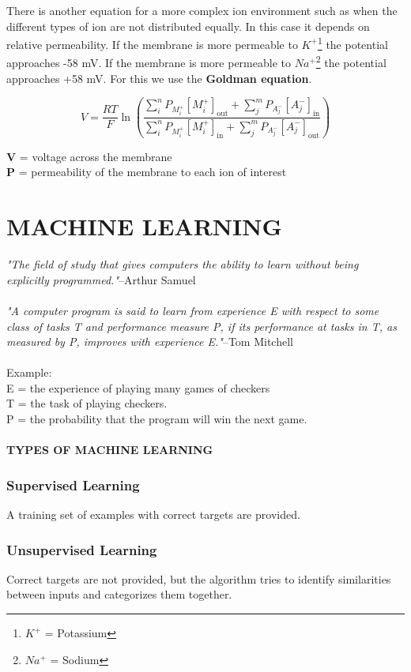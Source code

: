 \documentclass[english]{def}
\begin{document}
There is another equation for a more complex ion environment such as when the different types of ion are not distributed equally. In this case it depends on relative permeability. If the membrane is more permeable to $K^+$\footnote{$K^+$ = Potassium} the potential approaches -58 mV. If the membrane is more permeable to $Na^+$\footnote{$Na^+$ = Sodium} the potential approaches +58 mV. For this we use the \textbf{Goldman equation}.

\[ V={\frac {RT}{F}}\ln {\left({\frac {\sum _{i}^{n}P_{M_{i}^{+}}[M_{i}^{+}]_{\mathrm {out} }+\sum _{j}^{m}P_{A_{j}^{-}}[A_{j}^{-}]_{\mathrm {in} }}{\sum _{i}^{n}P_{M_{i}^{+}}[M_{i}^{+}]_{\mathrm {in} }+\sum _{j}^{m}P_{A_{j}^{-}}[A_{j}^{-}]_{\mathrm {out} }}}\right)}\]

\noindent\textbf{V} = voltage across the membrane\\
\textbf{P} = permeability of the membrane to each ion of interest\\

\section{MACHINE LEARNING}

\emph{ "The field of study that gives computers the ability to learn without being explicitly programmed."}--Arthur Samuel
\\\\
\emph{"A computer program is said to learn from experience E with respect to some class of tasks T and performance measure P, if its performance at tasks in T, as measured by P, improves with experience E."}--Tom Mitchell\\
\\
Example:\\
E = the experience of playing many games of checkers
\\
T = the task of playing checkers.
\\
P = the probability that the program will win the next game.
\\\\
\textbf{TYPES OF MACHINE LEARNING} 
\subsubsection{Supervised Learning} A training set of examples with correct targets are provided.
\subsubsection{Unsupervised Learning} Correct targets are not provided, but the algorithm tries to identify similarities between inputs and categorizes them together. 
\end{document}
